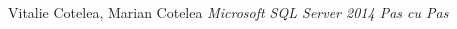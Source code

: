 \begin{thebibliography}{99999}
\singlespace\normalsize

\bibitem{} 
Vitalie Cotelea, Marian Cotelea
\textit{Microsoft SQL Server 2014 Pas cu Pas}

\end{thebibliography}

